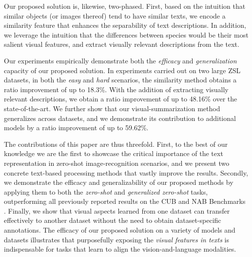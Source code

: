 \documentclass[11pt,a4paper]{article}
\newcommand\gal[1]{\textcolor{bright}{\textbf{GAL:} #1 }}
\newcommand\reut[1]{\textcolor{green}{\textbf{REUT:} #1 }}
\begin{document}
Our proposed solution is, likewise, two-phased. First,
based on the intuition that similar objects (or images thereof) tend to have similar texts,  %
we encode a similarity feature that  enhances the separability of  text descriptions. %
In addition, we leverage the intuition that the differences between species would be their most salient visual features, and extract visually relevant  descriptions from the text.



Our experiments empirically demonstrate both the {\em efficacy} and  {\em generalization} capacity of our proposed solution. 
In experiments carried out on two large ZSL datasets, %
in both the {\em easy} and {\em hard} scenarios, the similarity method obtains a ratio improvement of up to 18.3\%. With the addition of extracting visually relevant descriptions, we obtain a ratio improvement of up to 48.16\% over the state-of-the-art.
We further show that our visual-summarization method generalizes across datasets, and we demonstrate its contribution to additional models by a ratio improvement of up to 59.62\%.



The contributions of this paper are thus threefold.
First,  to the best of our knowledge we are the first to showcase the critical importance of the text representation in zero-shot image-recognition scenarios, and we present two concrete text-based processing methods that vastly improve the results.
Secondly, we demonstrate the efficacy and generalizability of our proposed methods by applying them to both the {\em zero-shot} and {\em generalized zero-shot} tasks, outperforming all previously reported results on the CUB and NAB Benchmarks \citep{wah2011caltech, van2015building}. Finally, we show that visual aspects learned from one dataset can transfer effectively  to another dataset without the need to obtain dataset-specific annotations.  
The efficacy of our proposed solution on a variety of models and datasets illustrates that purposefully exposing the {\em visual features in texts} is indispensable  for tasks that learn to align the  vision-and-language modalities. %
\end{document}
